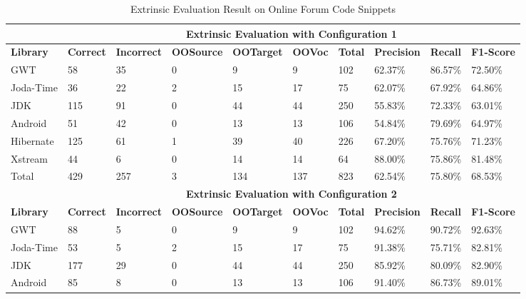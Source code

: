 \begin{table*}[t]
\tiny
\centering
\caption{Extrinsic Evaluation Result on Online Forum Code Snippets}
\begin{tabular}{|l|l|l|l|l|l|l|l|l|l|}
\hline
          & \multicolumn{9}{c|}{\textbf{Extrinsic Evaluation with Configuration 1}}                             \\ \hline
\textbf{Library}   & \textbf{Correct} & \textbf{Incorrect} & \textbf{OOSource} & \textbf{OOTarget} & \textbf{OOVoc}  & \textbf{Total}   & \textbf{Precision} & \textbf{Recall}  & \textbf{F1-Score} \\ \hline
GWT       & 58      & 35        & 0        & 9        & 9     & 102   & 62.37\%   & 86.57\% & 72.50\%  \\ \hline
Joda-Time & 36      & 22        & 2        & 15       & 17    & 75    & 62.07\%   & 67.92\% & 64.86\%  \\ \hline
JDK       & 115     & 91        & 0        & 44       & 44    & 250   & 55.83\%   & 72.33\% & 63.01\%  \\ \hline
Android   & 51      & 42        & 0        & 13       & 13    & 106   & 54.84\%   & 79.69\% & 64.97\%  \\ \hline
Hibernate & 125     & 61        & 1        & 39       & 40    & 226   & 67.20\%   & 75.76\% & 71.23\%  \\ \hline
Xstream   & 44      & 6         & 0        & 14       & 14    & 64    & 88.00\%   & 75.86\% & 81.48\%  \\ \hline
Total     & 429     & 257       & 3        & 134      & 137   & 823   & 62.54\%   & 75.80\% & 68.53\%  \\ \hline
          & \multicolumn{9}{c|}{\textbf{Extrinsic Evaluation with Configuration 2}}                             \\ \hline
\textbf{Library}   & \textbf{Correct} & \textbf{Incorrect} & \textbf{OOSource} & \textbf{OOTarget} & \textbf{OOVoc}  & \textbf{Total}   & \textbf{Precision} & \textbf{Recall}  & \textbf{F1-Score} \\ \hline
GWT       & 88      & 5         & 0        & 9        & 9     & 102   & 94.62\%   & 90.72\% & 92.63\%  \\ \hline
Joda-Time & 53      & 5         & 2        & 15       & 17    & 75    & 91.38\%   & 75.71\% & 82.81\%  \\ \hline
JDK       & 177     & 29        & 0        & 44       & 44    & 250   & 85.92\%   & 80.09\% & 82.90\%  \\ \hline
Android   & 85      & 8         & 0        & 13       & 13    & 106   & 91.40\%   & 86.73\% & 89.01\%  \\ \hline

\end{tabular}
\end{table*}
